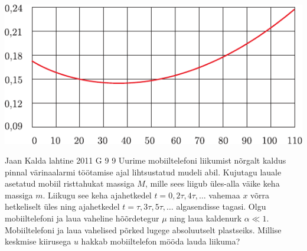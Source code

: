 \documentclass[11pt, twoside]{article}
\begin{document}
{{\begin{center}
	\includegraphics[width=\linewidth]{2006-lahg-10-yl}
\end{center}
\fi
}

{Jaan Kalda} %
{lahtine} %
{2011} %
{G 9} %
{9} %
{
\ifStatement
Uurime mobiiltelefoni liikumist nõrgalt kaldus pinnal värinaalarmi töötamise
ajal lihtsustatud mudeli abil.
Kujutagu lauale asetatud mobiil risttahukat massiga $M$, mille sees liigub
üles-alla väike keha massiga $m$.
Liikugu see keha ajahetkedel $t=0, 2\tau, 4\tau, \ldots$ vahemaa $x$ võrra
hetkeliselt üles ning ajahetkedel $t=\tau, 3\tau, 5\tau, \ldots$ algasendisse
tagasi.
Olgu mobiiltelefoni ja laua vaheline hõõrdetegur $\mu$ ning laua kaldenurk
$\alpha \ll 1$. Mobiiltelefoni ja laua vahelised põrked lugege absoluutselt
plastseiks.
Millise keskmise kiirusega $u$ hakkab mobiiltelefon mööda lauda liikuma?
\fi
}

}
\end{document}
